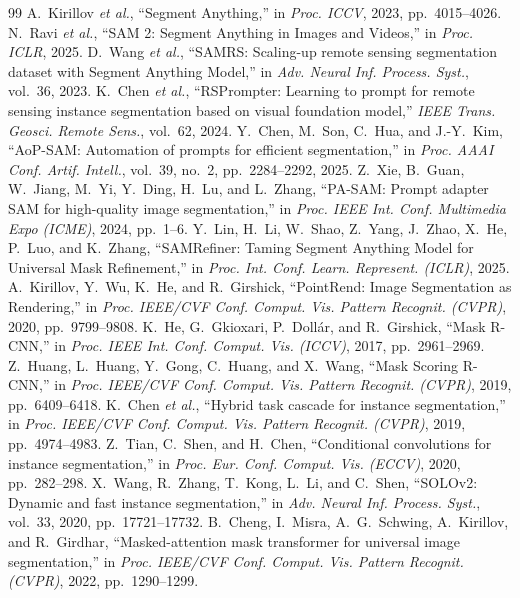 \documentclass{article}
\begin{document}
\clearpage

\begin{thebibliography}{99}
 A.~Kirillov \textit{et al.}, ``Segment Anything,'' in \textit{Proc. ICCV}, 2023, pp.~4015--4026.
 N.~Ravi \textit{et al.}, ``SAM 2: Segment Anything in Images and Videos,'' in \textit{Proc. ICLR}, 2025.
 D.~Wang \textit{et al.}, ``SAMRS: Scaling-up remote sensing segmentation dataset with Segment Anything Model,'' in \textit{Adv. Neural Inf. Process. Syst.}, vol.~36, 2023.
 K.~Chen \textit{et al.}, ``RSPrompter: Learning to prompt for remote sensing instance segmentation based on visual foundation model,'' \textit{IEEE Trans. Geosci. Remote Sens.}, vol.~62, 2024.
 Y.~Chen, M.~Son, C.~Hua, and J.-Y.~Kim, ``AoP-SAM: Automation of prompts for efficient segmentation,'' in \textit{Proc. AAAI Conf. Artif. Intell.}, vol.~39, no.~2, pp.~2284--2292, 2025.
 Z.~Xie, B.~Guan, W.~Jiang, M.~Yi, Y.~Ding, H.~Lu, and L.~Zhang, ``PA-SAM: Prompt adapter SAM for high-quality image segmentation,'' in \textit{Proc. IEEE Int. Conf. Multimedia Expo (ICME)}, 2024, pp.~1--6.
 Y.~Lin, H.~Li, W.~Shao, Z.~Yang, J.~Zhao, X.~He, P.~Luo, and K.~Zhang, ``SAMRefiner: Taming Segment Anything Model for Universal Mask Refinement,'' in \textit{Proc. Int. Conf. Learn. Represent. (ICLR)}, 2025.
 A.~Kirillov, Y.~Wu, K.~He, and R.~Girshick, ``PointRend: Image Segmentation as Rendering,'' in \textit{Proc. IEEE/CVF Conf. Comput. Vis. Pattern Recognit. (CVPR)}, 2020, pp.~9799--9808.
 K.~He, G.~Gkioxari, P.~Doll\'ar, and R.~Girshick, ``Mask R-CNN,'' in \textit{Proc. IEEE Int. Conf. Comput. Vis. (ICCV)}, 2017, pp.~2961--2969.
 Z.~Huang, L.~Huang, Y.~Gong, C.~Huang, and X.~Wang, ``Mask Scoring R-CNN,'' in \textit{Proc. IEEE/CVF Conf. Comput. Vis. Pattern Recognit. (CVPR)}, 2019, pp.~6409--6418.
 K.~Chen \textit{et al.}, ``Hybrid task cascade for instance segmentation,'' in \textit{Proc. IEEE/CVF Conf. Comput. Vis. Pattern Recognit. (CVPR)}, 2019, pp.~4974--4983.
 Z.~Tian, C.~Shen, and H.~Chen, ``Conditional convolutions for instance segmentation,'' in \textit{Proc. Eur. Conf. Comput. Vis. (ECCV)}, 2020, pp.~282--298.
 X.~Wang, R.~Zhang, T.~Kong, L.~Li, and C.~Shen, ``SOLOv2: Dynamic and fast instance segmentation,'' in \textit{Adv. Neural Inf. Process. Syst.}, vol.~33, 2020, pp.~17721--17732.
 B.~Cheng, I.~Misra, A.~G.~Schwing, A.~Kirillov, and R.~Girdhar, ``Masked-attention mask transformer for universal image segmentation,'' in \textit{Proc. IEEE/CVF Conf. Comput. Vis. Pattern Recognit. (CVPR)}, 2022, pp.~1290--1299.

\end{thebibliography}
\end{document}
